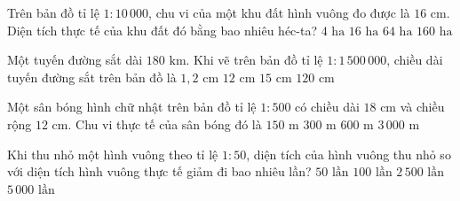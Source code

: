 \begin{ex} %
Trên bản đồ tỉ lệ $1 : 10\,000$, chu vi của một khu đất hình vuông đo được là $16\text{ cm}$. Diện tích thực tế của khu đất đó bằng bao nhiêu héc-ta?
\choice
{$4\text{ ha}$}
{\True $16\text{ ha}$}
{$64\text{ ha}$}
{$160\text{ ha}$}
\end{ex}

\begin{ex} %
Một tuyến đường sắt dài $180\text{ km}$. Khi vẽ trên bản đồ tỉ lệ $1 : 1\,500\,000$, chiều dài tuyến đường sắt trên bản đồ là
\choice
{$1{,}2\text{ cm}$}
{\True $12\text{ cm}$}
{$15\text{ cm}$}
{$120\text{ cm}$}
\end{ex}

\begin{ex} %
Một sân bóng hình chữ nhật trên bản đồ tỉ lệ $1 : 500$ có chiều dài $18\text{ cm}$ và chiều rộng $12\text{ cm}$. Chu vi thực tế của sân bóng đó là
\choice
{$150\text{ m}$}
{\True $300\text{ m}$}
{$600\text{ m}$}
{$3\,000\text{ m}$}
\end{ex}

\begin{ex} %
Khi thu nhỏ một hình vuông theo tỉ lệ $1 : 50$, diện tích của hình vuông thu nhỏ so với diện tích hình vuông thực tế giảm đi bao nhiêu lần?
\choice
{$50\text{ lần}$}
{$100\text{ lần}$}
{\True $2\,500\text{ lần}$}
{$5\,000\text{ lần}$}
\end{ex}

